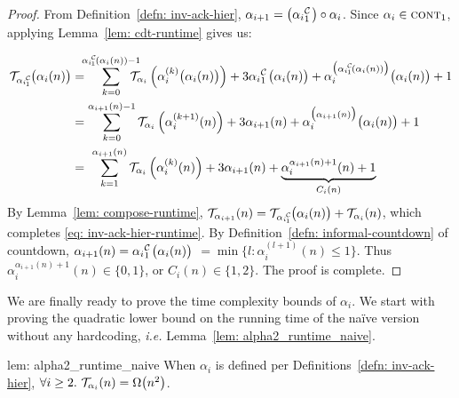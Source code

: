 \begin{proof}
	 From Definition~\ref{defn: inv-ack-hier}, $\alpha_{i+1} = \big(\cdt{\alpha_i}{1}\big)\circ \alpha_i$. Since $\alpha_i\in \text{\scshape{cont}}_{1}$, applying Lemma~\ref{lem: cdt-runtime} gives us:

	 \begin{equation*}
	 \begin{aligned}
	 \runtime_{\cdt{\alpha_i}{1}}\big(\alpha_i(n)\big)
	 & = \hspace{-5pt} \sum_{k=0}^{\cdt{\alpha_i}{1}(\alpha_i(n)) - 1} \hspace{-10pt} \runtime_{\alpha_i}\left(\alpha_i^{(k)}\big(\alpha_i(n)\big)\right)
	 + 3\cdt{\alpha_i}{1}\big(\alpha_i(n)\big)
	 + \alpha_i^{\big(\cdt{\alpha_i}{1}(\alpha_i(n))\big)}\big(\alpha_i(n)\big) + 1 \\
	 & = \sum_{k=0}^{\alpha_{i+1}(n) - 1} \runtime_{\alpha_i}\left(\alpha_i^{(k+1)}(n)\right)
	 + 3\alpha_{i+1}(n)
	 + \alpha_i^{\big(\alpha_{i+1}(n)\big)}\big(\alpha_i(n)\big) + 1 \\
	 & = \ \sum_{k=1}^{\alpha_{i+1}(n)} \runtime_{\alpha_i}\left(\alpha_i^{(k)}(n)\right)
	 + 3\alpha_{i+1}(n)
	 + \underbrace{\alpha_i^{\alpha_{i+1}(n) + 1}(n) + 1}_{C_i(n)}
	 \end{aligned}
	 \end{equation*}By Lemma~\ref{lem: compose-runtime}, $\runtime_{\alpha_{i+1}}(n) = \runtime_{\cdt{\alpha_i}{1}}\big(\alpha_i(n)\big) + \runtime_{\alpha_i}(n)$, which completes \eqref{eq: inv-ack-hier-runtime}. By Definition~\ref{defn: informal-countdown} of countdown, $\alpha_{i+1}(n) = \cdt{\alpha_i}{1}\big(\alpha_i(n)\big)$
	 $= \min\big\{l: \alpha_i^{(l+1)}(n)\le 1\big\}$. Thus $\alpha_i^{\alpha_{i+1}(n) + 1}(n) \in \{0, 1\}$, or $C_i(n)\in \{1, 2\}$. The proof is complete.
\end{proof}

\noindent We are finally ready to prove the time complexity bounds of $\alpha_i$. We start with proving the quadratic lower bound on the running time of the na\"ive version without any hardcoding, \emph{i.e.} Lemma~\ref{lem: alpha2_runtime_naive}.

\begin{uselemcounterof}{lem: alpha2_runtime_naive}
	When $\alpha_i$ is defined per Definitions~\ref{defn: inv-ack-hier}, $\forall i\ge 2.~\mathcal{T}_{\alpha_i}(n) = \Omega\big(n^2\big)$.
\end{uselemcounterof}

